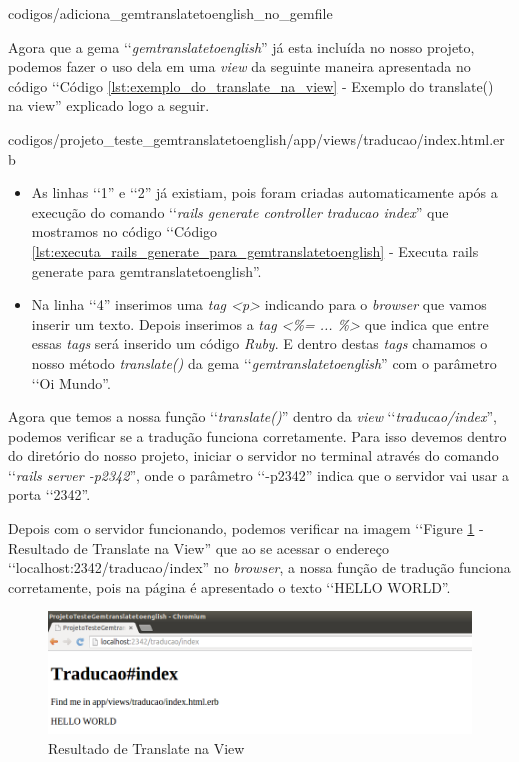  
{codigos/adiciona_gemtranslatetoenglish_no_gemfile}
 
Agora que a gema ‘‘\emph{gemtranslatetoenglish}'' já esta incluída no nosso projeto, podemos fazer o uso 
dela em uma \emph{view} da seguinte maneira apresentada no código ‘‘Código 
\ref{lst:exemplo_do_translate_na_view} - Exemplo do translate() na view'' explicado logo a seguir.


{codigos/projeto_teste_gemtranslatetoenglish/app/views/traducao/index.html.erb} 
 
 \begin{itemize}
 
  \item As linhas ‘‘1'' e ‘‘2'' já existiam, pois foram criadas automaticamente após a execução do comando 
  ‘‘\emph{rails generate controller traducao index}'' que mostramos no código ‘‘Código 
  \ref{lst:executa_rails_generate_para_gemtranslatetoenglish} - Executa rails generate para 
  gemtranslatetoenglish''.
  
  \item Na linha ‘‘4'' inserimos uma \emph{tag <p>} indicando para o \emph{browser} que vamos inserir um 
  texto. Depois inserimos a \emph{tag <\%= ... \%>} que indica que entre essas \emph{tags} será inserido um 
  código \emph{Ruby}. E dentro destas \emph{tags} chamamos o nosso método \emph{translate()} da gema 
  ‘‘\emph{gemtranslatetoenglish}'' com o parâmetro ‘‘Oi Mundo''.
  
 \end{itemize}

Agora que temos a nossa função ‘‘\emph{translate()}'' dentro da \emph{view} ‘‘\emph{traducao/index}'', podemos 
verificar se a tradução funciona corretamente. Para isso devemos dentro do diretório do nosso projeto,
iniciar o servidor no terminal através do comando ‘‘\emph{rails server -p2342}'', onde o parâmetro ‘‘-p2342'' 
indica que o servidor vai usar a porta ‘‘2342''. 

Depois com o servidor funcionando, podemos verificar na imagem ‘‘Figure \ref{fig:resultado_de_translate_na_view} - 
Resultado de Translate na View'' que ao se acessar o endereço ‘‘localhost:2342/traducao/index'' no 
\emph{browser}, a nossa função de tradução funciona corretamente, pois na página é apresentado o 
texto ‘‘HELLO WORLD''.
 
 \begin{figure}[ht]
  \includegraphics[scale=0.49]{images/resultado_de_translate_na_view.png}
  \caption{Resultado de Translate na View}
  \label{fig:resultado_de_translate_na_view}
\end{figure}